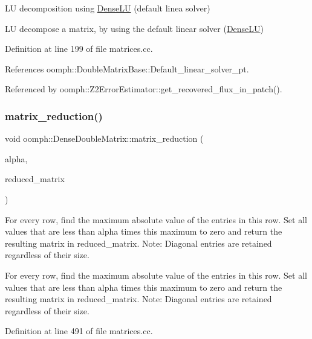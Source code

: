 LU decomposition using \hyperlink{classoomph_1_1DenseLU}{Dense\+LU} (default linea solver) 

LU decompose a matrix, by using the default linear solver (\hyperlink{classoomph_1_1DenseLU}{Dense\+LU}) 

Definition at line 199 of file matrices.\+cc.



References oomph\+::\+Double\+Matrix\+Base\+::\+Default\+\_\+linear\+\_\+solver\+\_\+pt.



Referenced by oomph\+::\+Z2\+Error\+Estimator\+::get\+\_\+recovered\+\_\+flux\+\_\+in\+\_\+patch().

\mbox{\label{classoomph_1_1DenseDoubleMatrix_a64b81a329f8e9204e50b75ea367a77d4}} 
\subsubsection{\texorpdfstring{matrix\+\_\+reduction()}{matrix\_reduction()}}
{\footnotesize\ttfamily void oomph\+::\+Dense\+Double\+Matrix\+::matrix\+\_\+reduction (\begin{DoxyParamCaption}\item[{const double \&}]{alpha,  }\item[{\hyperlink{classoomph_1_1DenseDoubleMatrix}{Dense\+Double\+Matrix} \&}]{reduced\+\_\+matrix }\end{DoxyParamCaption})}



For every row, find the maximum absolute value of the entries in this row. Set all values that are less than alpha times this maximum to zero and return the resulting matrix in reduced\+\_\+matrix. Note\+: Diagonal entries are retained regardless of their size. 

For every row, find the maximum absolute value of the entries in this row. Set all values that are less than alpha times this maximum to zero and return the resulting matrix in reduced\+\_\+matrix. Note\+: Diagonal entries are retained regardless of their size. 

Definition at line 491 of file matrices.\+cc.



